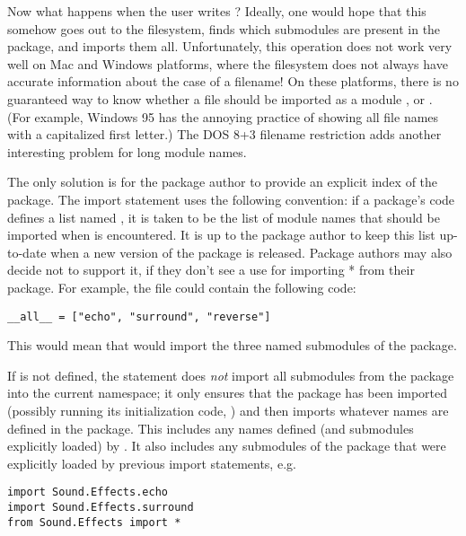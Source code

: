 \documentclass{manual}
\begin{document}
Now what happens when the user writes ?  Ideally, one would hope that this somehow goes out to the
filesystem, finds which submodules are present in the package, and
imports them all.  Unfortunately, this operation does not work very
well on Mac and Windows platforms, where the filesystem does not
always have accurate information about the case of a filename!  On
these platforms, there is no guaranteed way to know whether a file
 should be imported as a module ,
 or .  (For example, Windows 95 has the
annoying practice of showing all file names with a capitalized first
letter.)  The DOS 8+3 filename restriction adds another interesting
problem for long module names.

The only solution is for the package author to provide an explicit
index of the package.  The import statement uses the following
convention: if a package's  code defines a list named
, it is taken to be the list of module names that should be imported
when  is
encountered.  It is up to the package author to keep this list
up-to-date when a new version of the package is released.  Package
authors may also decide not to support it, if they don't see a use for
importing * from their package.  For example, the file
 could contain the following code:

\begin{verbatim}
__all__ = ["echo", "surround", "reverse"]
\end{verbatim}

This would mean that  would
import the three named submodules of the  package.

If  is not defined, the statement  does \emph{not} import all submodules from the package
 into the current namespace; it only ensures that the
package  has been imported (possibly running its
initialization code, ) and then imports whatever names are
defined in the package.  This includes any names defined (and
submodules explicitly loaded) by .  It also includes any
submodules of the package that were explicitly loaded by previous
import statements, e.g.

\begin{verbatim}
import Sound.Effects.echo
import Sound.Effects.surround
from Sound.Effects import *
\end{verbatim}
\end{document}

